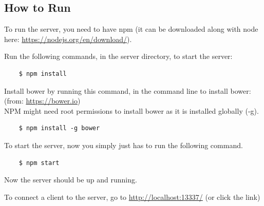 \documentclass[a4paper]{article}
\begin{document}
\newpage
\begin{appendices}
\section{How to Run}
\label{app_h2r}
To run the server, you need to have npm (it can be downloaded along with
  node here: \url{https://nodejs.org/en/download/}).

Run the following commands, in the server directory, to start the server:
\begin{verbatim}
	$ npm install
\end{verbatim}
  
Install bower by running this command, in the command line to install
bower: (from: \url{https://bower.io})\\
NPM might need root permissions to install bower as it is installed globally (-g).

\begin{verbatim}
	$ npm install -g bower
\end{verbatim}

To start the server, now you simply just has to run the following command.

\begin{verbatim}
	$ npm start
\end{verbatim}

Now the server should be up and running.

To connect a client to the server, go to \url{http://localhost:13337/} (or click the link)
\end{appendices}
\end{document}
